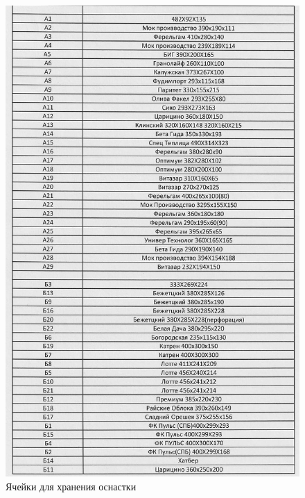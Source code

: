 \begin{figure}
\begin{center}
 \includegraphics[height=0.8\textheight, keepaspectratio]{Pics/II.5.7.jpg}
\end{center}
 \caption{Ячейки для хранения оснастки}
 \label{pic:II.5.7}
\end{figure}

\clearpage

